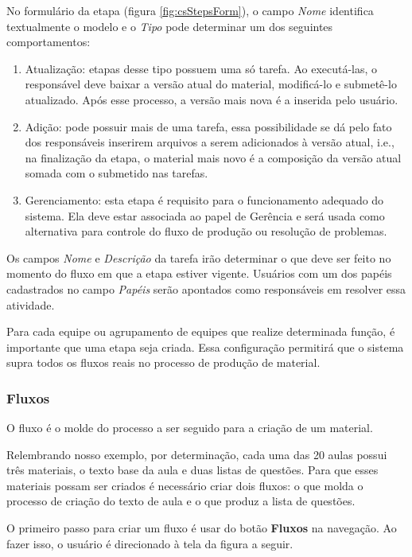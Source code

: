 No formulário da etapa (figura \hyperref[fig:csStepsForm]{\ref{fig:csStepsForm}}), o campo \textit{Nome} identifica textualmente o modelo e o \textit{Tipo} pode determinar um dos seguintes comportamentos:

\begin{enumerate}  
\item Atualização: etapas desse tipo possuem uma só tarefa. Ao executá-las, o responsável deve baixar a versão atual do material, modificá-lo e submetê-lo atualizado. Após esse processo, a versão mais nova é a inserida pelo usuário.
\item Adição: pode possuir mais de uma tarefa, essa possibilidade se dá pelo fato dos responsáveis inserirem arquivos a serem adicionados à versão atual, i.e., na finalização da etapa, o material mais novo é a composição da versão atual somada com o submetido nas tarefas.
\item Gerenciamento: esta etapa é requisito para o funcionamento adequado do sistema. Ela deve estar associada ao papel de Gerência e será usada como alternativa para controle do fluxo de produção ou resolução de problemas.
\end{enumerate}

Os campos \textit{Nome} e \textit{Descrição} da tarefa irão determinar o que deve ser feito no momento do fluxo em que a etapa estiver vigente. Usuários com um dos papéis cadastrados no campo \textit{Papéis} serão apontados como responsáveis em resolver essa atividade.

Para cada equipe ou agrupamento de equipes que realize determinada função, é importante que uma etapa seja criada. Essa configuração permitirá que o sistema supra todos os fluxos reais no processo de produção de material.

\subsubsection{Fluxos}

O fluxo é o molde do processo a ser seguido para a criação de um material.

Relembrando nosso exemplo, por determinação, cada uma das 20 aulas possui três materiais, o texto base da aula e duas listas de questões. Para que esses materiais possam ser criados é necessário criar dois fluxos: o que molda o processo de criação do texto de aula e o que produz a lista de questões.

O primeiro passo para criar um fluxo é usar do botão \textbf{Fluxos} na navegação. Ao fazer isso, o usuário é direcionado à tela da figura a seguir.

